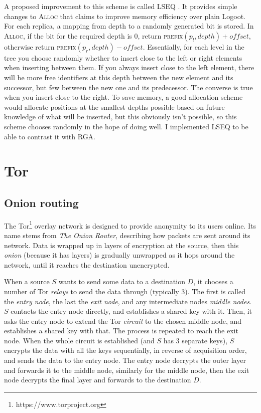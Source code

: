 \documentclass[diss.tex]{subfiles}
\begin{document}
A proposed improvement to this scheme is called LSEQ \cite{lseq}. It provides simple changes to \textsc{Alloc} that claims to improve memory efficiency over plain Logoot. For each replica, a mapping from depth to a randomly generated bit is stored. In \textsc{Alloc}, if the bit for the required depth is 0, return \textsc{prefix}$(p_l, depth) + o\!f\!f\!set$, otherwise return \textsc{prefix}$(p_r, depth) - o\!f\!f\!set$. Essentially, for each level in the tree you choose randomly whether to insert close to the left or right elements when inserting between them. If you always insert close to the left element, there will be more free identifiers at this depth between the new element and its successor, but few between the new one and its predecessor. The converse is true when you insert close to the right. To save memory, a good allocation scheme would allocate positions at the smallest depths possible based on future knowledge of what will be inserted, but this obviously isn't possible, so this scheme chooses randomly in the hope of doing well. I implemented LSEQ to be able to contrast it with RGA.
%
%
%

\section{Tor}
\subsection{Onion routing}
The Tor\footnote{https://www.torproject.org} overlay network is designed to provide anonymity to its users online. Its name stems from \textit{The Onion Router}, describing how packets are sent around its network. Data is wrapped up in layers of encryption at the source, then this \textit{onion} (because it has layers) is gradually unwrapped as it hops around the network, until it reaches the destination unencrypted.

When a source $S$ wants to send some data to a destination $D$, it chooses a number of Tor \textit{relays} to send the data through (typically 3). The first is called the \textit{entry node}, the last the \textit{exit node}, and any intermediate nodes \textit{middle nodes}. $S$ contacts the entry node directly, and establishes a shared key with it. Then, it asks the entry node to extend the Tor \textit{circuit} to the chosen middle node, and establishes a shared key with that. The process is repeated to reach the exit node. When the whole circuit is established (and $S$ has 3 separate keys), $S$ encrypts the data with all the keys sequentially, in reverse of acquisition order, and sends the data to the entry node. The entry node decrypts the outer layer and forwards it to the middle node, similarly for the middle node, then the exit node decrypts the final layer and forwards to the destination $D$.
\end{document}
